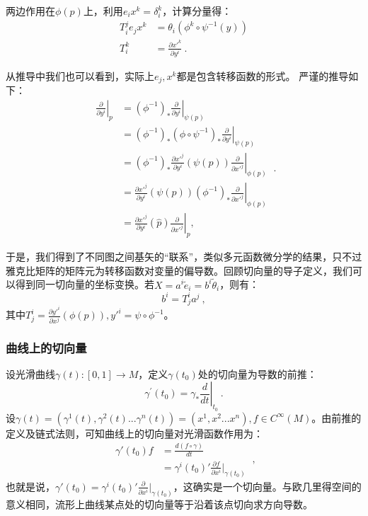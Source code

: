 两边作用在$\phi(p)$上，利用$e_ix^k=\delta^k_i$，计算分量得：
\begin{equation}
\begin{aligned}
 T^j_i e_j x^k&=\theta_i (\phi^k\circ \psi^{-1}(y))\\
T^k_i&=\frac{\partial x'^{k}}{\partial y^i}~.
\end{aligned}
\end{equation}

从推导中我们也可以看到，实际上$e_j,x^k$都是包含转移函数的形式。
严谨的推导如下：
\begin{equation}
\begin{aligned}
\left.\frac{\partial}{\partial y^i}\right|_p & =\left.\left(\phi^{-1}\right)_* \frac{\partial}{\partial y^i}\right|_{\psi(p)} \\
& =\left.\left(\phi^{-1}\right)_*\left(\phi \circ \psi^{-1}\right)_* \frac{\partial}{\partial y^i}\right|_{\psi(p)} \\
& =\left.\left(\phi^{-1}\right)_* \frac{\partial x'^j}{\partial y^i}(\psi(p)) \frac{\partial}{\partial x'^j}\right|_{\phi(p)} \\
& =\left.\frac{\partial x'^j}{\partial y^i}(\psi(p))\left(\phi^{-1}\right)_* \frac{\partial}{\partial x'^j}\right|_{\phi(p)} \\
& =\left.\frac{\partial x'^j}{\partial y^i}(\widehat{p}) \frac{\partial}{\partial x'^j}\right|_p,
\end{aligned}~.
\end{equation}

于是，我们得到了不同图之间基矢的“联系”，类似多元函数微分学的结果，只不过雅克比矩阵的矩阵元为转移函数对变量的偏导数。回顾切向量的导子定义，我们可以得到同一切向量的坐标变换。若$X=a^i\widetilde e_i=b^i\widetilde  \theta_i$，则有：
\begin{equation}
b^i=T^i_ja^j~,
\end{equation}
其中$T^i_j=\frac{\partial y'^{i}}{\partial x^j}(\phi(p)),y'^i=\psi\circ\phi^{-1}$。
\subsubsection{曲线上的切向量}
设光滑曲线$\gamma(t):[0,1]\rightarrow M$，定义$\gamma(t_0)$处的切向量为导数的前推：
\begin{equation}
\gamma^{\prime}\left(t_0\right)=\left.\gamma_* \frac{d}{d t}\right|_{t_0}~.
\end{equation}
设$\gamma(t)=(\gamma^1(t),\gamma^2(t)...\gamma^n(t))=(x^1,x^2...x^n),f\in C^{\infty}(M)$。由前推的定义及链式法则，可知曲线上的切向量对光滑函数作用为：
\begin{equation}
\begin{aligned}
\gamma'(t_0)f&=\frac{d(f\circ\gamma)}{dt}\\
&=\gamma^i(t_0)'\frac{\partial f}{\partial x^i}\bigg|_{\gamma(t_0)}
\end{aligned}~,
\end{equation}
也就是说，$\gamma'(t_0)=\gamma^i(t_0)'\frac{\partial }{\partial x^i}\bigg|_{\gamma(t_0)}$，这确实是一个切向量。与欧几里得空间的意义相同，流形上曲线某点处的切向量等于沿着该点切向求方向导数。

